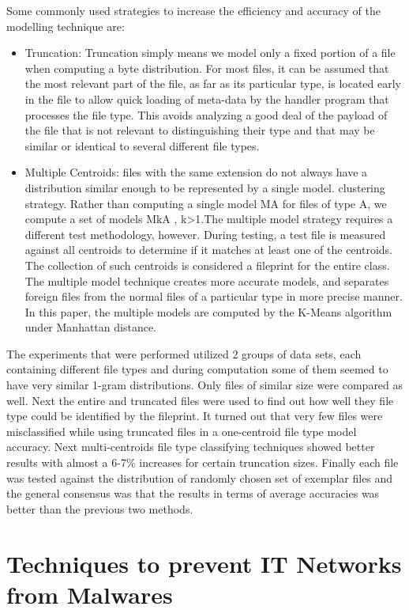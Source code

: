 \documentclass[11pt]{article}
\begin{document}
		Some commonly used strategies to increase the efficiency and accuracy of the modelling technique are:
		\begin{itemize}
			\item Truncation: Truncation simply means we model only a fixed portion of a file when computing a byte distribution. For most files, it can be assumed that the most relevant part of the file, as far as its particular type, is located early in the file to allow quick loading of meta-data by the handler program that processes the file type. This avoids analyzing a good deal of the payload of the file that is not relevant to distinguishing their type and that may be similar or identical to several different file types.
			\item Multiple Centroids: files with the same extension do not always have a distribution similar enough to be represented by a single model. clustering strategy. Rather than computing a single model MA for files of type A, we compute a set of models MkA , k>1.The multiple model strategy requires a different test methodology, however. During testing, a test file is measured against all centroids to determine if it matches at least one of the centroids. The collection of such centroids is considered a fileprint for the entire class. The multiple model technique creates more accurate models, and separates foreign files from the normal files of a particular type in more precise manner. In this paper, the multiple models are computed by the K-Means algorithm under Manhattan distance.
		\end{itemize}
		The experiments that were performed utilized 2 groups of data sets, each containing different file types and during computation some of them seemed to have very similar 1-gram distributions. Only files of similar size were compared as well. Next the entire and truncated files were used to find out how well they file type could be identified by the fileprint. It turned out that very few files were misclassified while using truncated files in a one-centroid file type model accuracy. Next multi-centroids file type classifying techniques showed better results with almost a 6-7\% increases for certain truncation sizes. Finally each file was tested against the distribution of randomly chosen set of exemplar files and the general consensus was that the results in terms of average accuracies was better than the previous two methods.


	\section{Techniques to prevent IT Networks from Malwares}
\end{document}
